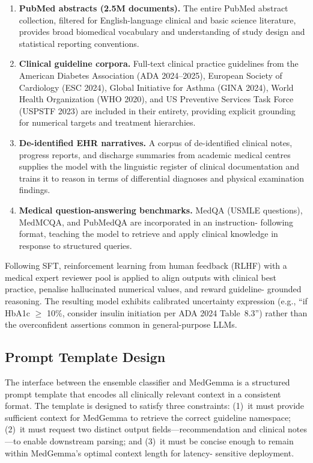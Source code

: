 \documentclass[journal]{IEEEtran}
\begin{document}
\begin{enumerate}

  \item \textbf{PubMed abstracts (2.5M documents).} The entire PubMed
  abstract collection, filtered for English-language clinical and basic
  science literature, provides broad biomedical vocabulary and
  understanding of study design and statistical reporting conventions.

  \item \textbf{Clinical guideline corpora.} Full-text clinical practice
  guidelines from the American Diabetes Association (ADA 2024--2025),
  European Society of Cardiology (ESC 2024), Global Initiative for Asthma
  (GINA 2024), World Health Organization (WHO 2020), and US Preventive
  Services Task Force (USPSTF 2023) are included in their entirety,
  providing explicit grounding for numerical targets and treatment hierarchies.

  \item \textbf{De-identified EHR narratives.} A corpus of de-identified
  clinical notes, progress reports, and discharge summaries from academic
  medical centres supplies the model with the linguistic register of
  clinical documentation and trains it to reason in terms of differential
  diagnoses and physical examination findings.

  \item \textbf{Medical question-answering benchmarks.} MedQA (USMLE
  questions), MedMCQA, and PubMedQA are incorporated in an instruction-
  following format, teaching the model to retrieve and apply clinical
  knowledge in response to structured queries.

\end{enumerate}

Following SFT, reinforcement learning from human feedback (RLHF) with a
medical expert reviewer pool is applied to align outputs with clinical best
practice, penalise hallucinated numerical values, and reward guideline-
grounded reasoning. The resulting model exhibits calibrated uncertainty
expression (e.g., ``if HbA1c $\geq$ 10\%, consider insulin initiation per
ADA 2024 Table~8.3'') rather than the overconfident assertions common in
general-purpose LLMs.

\subsection{Prompt Template Design}
\label{subsec:prompt}

The interface between the ensemble classifier and MedGemma is a structured
prompt template that encodes all clinically relevant context in a consistent
format. The template is designed to satisfy three constraints: (1)~it must
provide sufficient context for MedGemma to retrieve the correct guideline
namespace; (2)~it must request two distinct output fields—recommendation and
clinical notes—to enable downstream parsing; and (3)~it must be concise
enough to remain within MedGemma's optimal context length for latency-
sensitive deployment.
\end{document}

